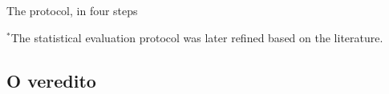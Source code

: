 \documentclass{beamer}
\begin{document}
\begin{frame}{The protocol, in four steps}
    \vspace{2mm}
    {\scriptsize $^{*}$The statistical evaluation protocol was later refined based on the
    literature.\par}
\end{frame}

\subsection{O veredito}



\end{document}
